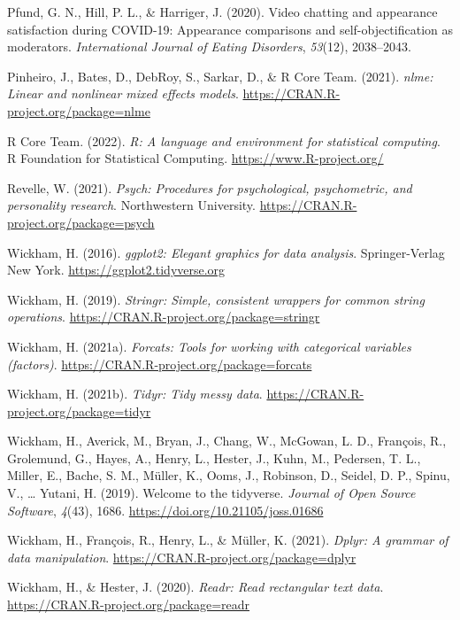\documentclass[
  english,
  man]{apa7}
\newlength{\cslhangindent}
\newlength{\cslentryspacingunit} %
\newenvironment{CSLReferences}[2] %
 {%
  \setlength{\parindent}{0pt}
  \ifodd #1
  \let\oldpar\par
  \def\par{\hangindent=\cslhangindent\oldpar}
  \fi
  \setlength{\parskip}{#2\cslentryspacingunit}
 }%
 {}
\begin{document}
\begin{CSLReferences}{1}{0}
\leavevmode{}%
Pfund, G. N., Hill, P. L., \& Harriger, J. (2020). Video chatting and appearance satisfaction during COVID-19: Appearance comparisons and self-objectification as moderators. \emph{International Journal of Eating Disorders}, \emph{53}(12), 2038--2043.

\leavevmode{}%
Pinheiro, J., Bates, D., DebRoy, S., Sarkar, D., \& R Core Team. (2021). \emph{{nlme}: Linear and nonlinear mixed effects models}. \url{https://CRAN.R-project.org/package=nlme}

\leavevmode{}%
R Core Team. (2022). \emph{R: A language and environment for statistical computing}. R Foundation for Statistical Computing. \url{https://www.R-project.org/}

\leavevmode{}%
Revelle, W. (2021). \emph{Psych: Procedures for psychological, psychometric, and personality research}. Northwestern University. \url{https://CRAN.R-project.org/package=psych}

\leavevmode{}%
Wickham, H. (2016). \emph{ggplot2: Elegant graphics for data analysis}. Springer-Verlag New York. \url{https://ggplot2.tidyverse.org}

\leavevmode{}%
Wickham, H. (2019). \emph{Stringr: Simple, consistent wrappers for common string operations}. \url{https://CRAN.R-project.org/package=stringr}

\leavevmode{}%
Wickham, H. (2021a). \emph{Forcats: Tools for working with categorical variables (factors)}. \url{https://CRAN.R-project.org/package=forcats}

\leavevmode{}%
Wickham, H. (2021b). \emph{Tidyr: Tidy messy data}. \url{https://CRAN.R-project.org/package=tidyr}

\leavevmode{}%
Wickham, H., Averick, M., Bryan, J., Chang, W., McGowan, L. D., François, R., Grolemund, G., Hayes, A., Henry, L., Hester, J., Kuhn, M., Pedersen, T. L., Miller, E., Bache, S. M., Müller, K., Ooms, J., Robinson, D., Seidel, D. P., Spinu, V., \ldots{} Yutani, H. (2019). Welcome to the {tidyverse}. \emph{Journal of Open Source Software}, \emph{4}(43), 1686. \url{https://doi.org/10.21105/joss.01686}

\leavevmode{}%
Wickham, H., François, R., Henry, L., \& Müller, K. (2021). \emph{Dplyr: A grammar of data manipulation}. \url{https://CRAN.R-project.org/package=dplyr}

\leavevmode{}%
Wickham, H., \& Hester, J. (2020). \emph{Readr: Read rectangular text data}. \url{https://CRAN.R-project.org/package=readr}

\end{CSLReferences}
\end{document}
